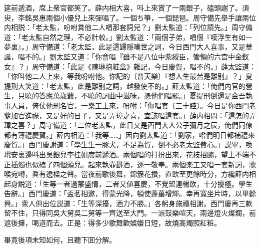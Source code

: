 筵前遞酒，席上衆官都笑了。薛内相大喜，呌上來賞了一兩銀子，磕頭謝了。須臾，李銘吳惠兩個小優兒上來彈唱了。一個ち箏，一個琵琶。周守備先擧手讓兩位内相説：「老太監，吩咐賞他二人唱那套詞兒？」劉太監道：「列位請先。」周守備道：「老太監自然之理，不必計較。」劉太監道：「兩個子弟，唱個『嘆浮生有如一夢裏』。」周守備道：「老太監，此是這歸隱嘆世之詞，今日西門大人喜事，又是華誕，唱不的。」劉太監又道：「你會唱『雖不是八位中紫綬臣，管領的六宫中金釵女』？」周守備道：「此是《陳琳抱粧盒》雜記，今日慶賀，唱不的。」薛太監道：「你呌他二人上來，等我吩咐他。你記的〔普天樂〕『想人生最苦是離别』？」夏提刑大笑道：「老太監，此是離别之詞，越發使不的。」薛太監道：「俺們内官的營生，只曉的答應萬歲爺，不曉的詞曲中滋味，憑他們唱罷。」夏提刑倒還是金吾執事人員，倚仗他刑名官，一樂工上來，吩咐：「你唱套〔三十腔〕。今日是你西門老爹加官進祿，又是好的日子，又是弄璋之喜，宜該唱這套。」薛内相問：「這怎的弄璋之喜？」周守備道：「二位老太監，此日又是西門大人公子彌月之辰，俺們同僚都有薄禮慶賀。」薛内相道：「我等……」因向劉太監道：「劉家，喒們明日都補禮來慶賀。」西門慶謝道：「學生生一豚犬，不足為賀，倒不必老太監費心。」説畢，喚玳安裏邊呌出吳銀兒李桂姐席前遞酒。兩個唱的打扮出來，花枝招颺，望上不端不正插燭也似磕了四個頭兒。起來執壺斟酒，逐一敬奉。兩個楽工又唱一套新詞，歌喉宛囀，眞有遶樑之聲。當夜前歌後舞，錦簇花攢，直飲至更餘時分，方纔薛内相起身説道：「生等一者過蒙盛情，二者又値喜慶，不覺留連暢飲，十分擾極。學生告辭。」西門慶道：「盃茗相邀，得蒙光降，頓使蓬蓽增輝。幸再寬坐片時，以畢餘興。」衆人俱出位説道：「生等深擾，酒力不勝。」各躬身施禮相謝。西門慶再三款留不住，只得同吳大舅吳二舅等一齊送至大門。一派鼓樂喧天，兩邊燈火燦爛，前遮後擁，喝道而去。正是：得多少歌舞歡娛嫌日短，故燒高燭照紅粧。

畢竟後項未知如何，且聽下囬分解。

